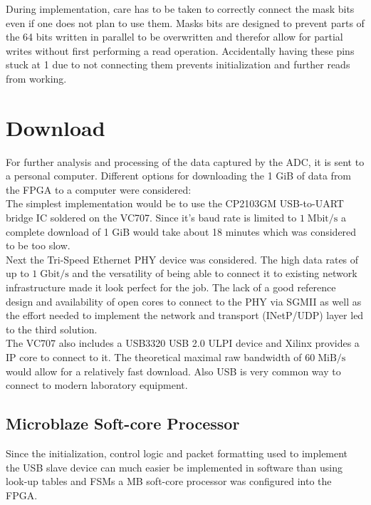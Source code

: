 During implementation, care has to be taken to correctly connect the mask bits
even if one does not plan to use them.
Masks bits are designed to prevent parts of the 64 bits written in parallel
to be overwritten and therefor allow for partial writes without first performing
a read operation. Accidentally having these pins stuck at 1 due to
not connecting them prevents initialization and further reads from
working. \\

\section{Download}
\label{sec:fpga_download}
For further analysis and processing of the data captured by the \gls{ADC},
it is sent to a personal computer.
Different options for downloading the 1 GiB of data from the \gls{FPGA}
to a computer were considered: \\

The simplest implementation would be to use the CP2103GM
\acrshort{USB}-to-\acrshort{UART} bridge \gls{IC} soldered on the VC707.
Since it's baud rate is limited to $1 \;\text{Mbit}/\text{s}$
a complete download of 1 GiB would take about 18 minutes which was
considered to be too slow. \\

Next the Tri-Speed Ethernet \gls{PHY} device was considered.
The high data rates of up to $1 \;\text{Gbit}/\text{s}$ and the versatility
of being able to connect it to existing network infrastructure made
it look perfect for the job. The lack of a good reference design and
availability of open cores to connect to the \gls{PHY} via
\gls{SGMII} as well as the effort needed to implement
the network and transport (\gls{INetP}/\gls{UDP}) layer
led to the third solution. \\

The VC707 also includes a USB3320 USB 2.0 ULPI device and Xilinx provides
a \gls{IP} core to connect to it. The theoretical maximal
raw bandwidth of $60 \;\text{MiB}/\text{s}$ would allow for a relatively fast
download. Also \gls{USB} is very common way to connect to modern laboratory
equipment.

\subsection{Microblaze Soft-core Processor}
Since the initialization, control logic and packet formatting
used to implement the \gls{USB} slave device can much easier be implemented
in software than using look-up tables and \glspl{FSM} a
\gls{MB} soft-core processor was configured into the \gls{FPGA}. \\

